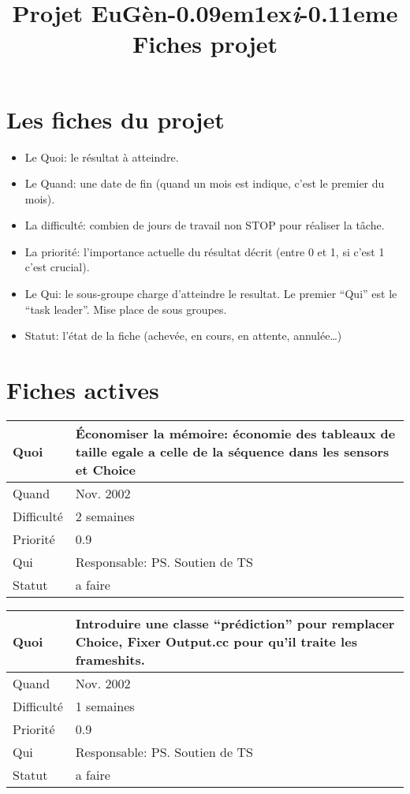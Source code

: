 \documentclass[a4paper,11pt]{article}
\title{Projet EuG\`en\kern-0.09em\raise1ex\hbox{\small\it i}\kern-0.11em\hbox{e}\\Fiches projet}
\begin{document}
\maketitle

\section{Les fiches du projet}

\begin{itemize}
\item Le Quoi: le r\'esultat \`a atteindre.
\item Le Quand: une date de fin (quand un mois est indique, c'est le
  premier du mois).
\item La difficult\'e: combien de jours de travail non STOP pour
  r\'ealiser la t\^ache.
\item La priorit{\'e}: l'importance actuelle du r{\'e}sultat
  d{\'e}crit (entre 0 et 1, si c'est 1 c'est crucial).
\item Le Qui: le sous-groupe charge d'atteindre le resultat.  Le
  premier ``Qui'' est le ``task leader''. Mise place de sous groupes.
\item Statut: l'\'etat de la fiche (achev\'ee, en cours, en attente,
  annul\'ee\ldots)
\end{itemize}


\section{Fiches actives}


\begin{longtable}{|l|p{7cm}|}\hline
  Quoi & \'Economiser la m\'emoire: \'economie des tableaux de taille egale a celle de la s\'equence dans les sensors et Choice \\\hline
  Quand  &  Nov. 2002\\\hline
  Difficult\'e &  2 semaines\\\hline
  Priorit\'e & 0.9 \\\hline
  Qui & Responsable: PS. Soutien de TS\\\hline
  Statut & a faire\\\hline
\end{longtable}

\begin{longtable}{|l|p{7cm}|}\hline
  Quoi & Introduire une classe ``pr\'ediction'' pour remplacer Choice, Fixer Output.cc pour qu'il traite les frameshits.\\\hline
  Quand  &  Nov. 2002\\\hline
  Difficult\'e &  1 semaines\\\hline
  Priorit\'e & 0.9 \\\hline
  Qui & Responsable: PS. Soutien de TS\\\hline
  Statut & a faire\\\hline
\end{longtable}
\end{document}
